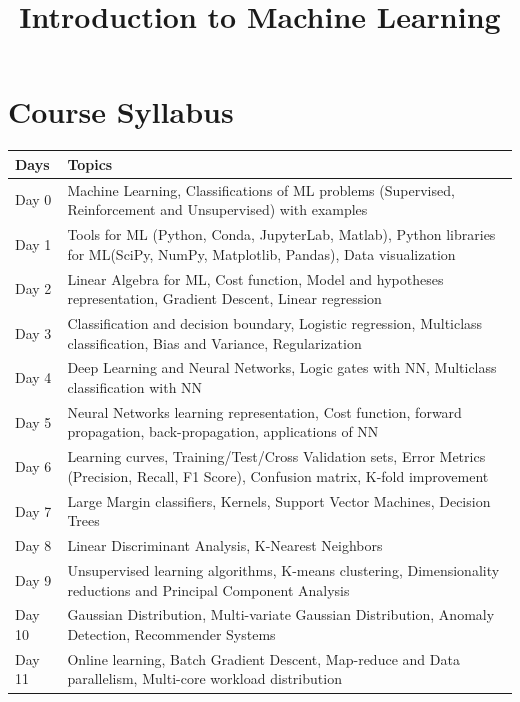 \documentclass[11pt]{article}
\title{Introduction to Machine Learning}
\date{}
\begin{document}
\maketitle
\section{Course Syllabus}
\begin{center}
\begin{tabular}{|m{1.15cm}|m{15cm}|}
\hline
Days &Topics\\ \hline
Day 0 & Machine Learning, Classifications of ML problems (Supervised, Reinforcement and Unsupervised) with examples\\ \hline
Day 1 & Tools for ML (Python, Conda, JupyterLab, Matlab), Python libraries for ML(SciPy, NumPy, Matplotlib, Pandas), Data visualization\\ \hline
Day 2 & Linear Algebra for ML, Cost function, Model and hypotheses representation, Gradient Descent, Linear regression\\ \hline
Day 3 & Classification and decision boundary, Logistic regression, Multiclass classification, Bias and Variance, Regularization\\ \hline
Day 4 & Deep Learning and Neural Networks, Logic gates with NN, Multiclass classification with NN\\ \hline
Day 5 & Neural Networks learning representation, Cost function, forward propagation, back-propagation, applications of NN\\ \hline
Day 6 & Learning curves, Training/Test/Cross Validation sets, Error Metrics (Precision, Recall, F1 Score), Confusion matrix, K-fold improvement\\ \hline
Day 7 & Large Margin classifiers, Kernels, Support Vector Machines, Decision Trees\\ \hline
Day 8 & Linear Discriminant Analysis, K-Nearest Neighbors\\ \hline
Day 9 & Unsupervised learning algorithms, K-means clustering, Dimensionality reductions and Principal Component Analysis\\ \hline
Day 10 & Gaussian Distribution, Multi-variate Gaussian Distribution, Anomaly Detection, Recommender Systems\\ \hline
Day 11 & Online learning, Batch Gradient Descent, Map-reduce and Data parallelism, Multi-core workload distribution\\ \hline
\end{tabular}
\end{center}
\end{document}
